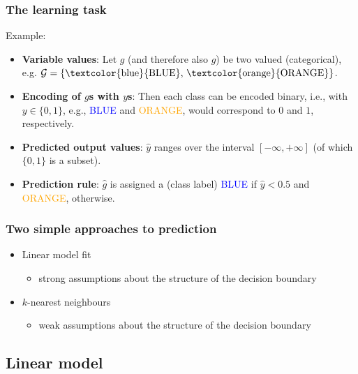 \documentclass[notes]{beamer}          %
\begin{document}
\begin{frame}
\frametitle{The learning task}
    Example:
    \begin{itemize}
         \item {\bf Variable values}: Let $g$ (and therefore also $\hat{g}$) be two valued (categorical), e.g. $\cal{G} = \{ \text{\textcolor{blue}{BLUE}, \textcolor{orange}{ORANGE}}\}$.
        \item {\bf Encoding of $g$s with $y$s}: Then each class can be encoded binary, i.e., with $y \in \{0,1\}$, e.g., \textcolor{blue}{BLUE} and \textcolor{orange}{ORANGE}, would correspond to $0$ and $1$, respectively.
        \item {\bf Predicted output values}: $\hat{y}$ ranges over the interval $[-\infty,+\infty]$ (of which $\{0,1\}$ is a subset).
        \item {\bf Prediction rule}: $\hat{g}$ is assigned a (class label) \textcolor{blue}{BLUE} if $\hat{y} < 0.5$ and \textcolor{orange}{ORANGE}, otherwise.

    \end{itemize}
\end{frame}



\begin{frame}
\frametitle{Two simple approaches to prediction}
\begin{itemize}
    \item Linear model fit
        \begin{itemize}
            \item strong assumptions about the structure of the decision boundary
        \end{itemize}
    \item $k$-nearest neighbours
        \begin{itemize}
            \item weak assumptions about the structure of the decision boundary
        \end{itemize}
\end{itemize}

\end{frame}

\subsection{Linear model}
\end{document}
